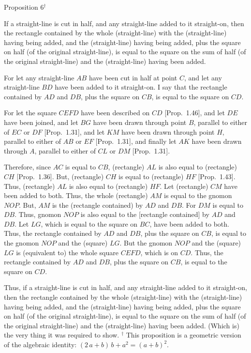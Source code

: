 
\begin{center}
{\large Proposition 6$^\dag$}
\end{center}

If a straight-line is cut in half, and any straight-line added to it straight-on,
then the rectangle contained by the whole (straight-line) with the (straight-line) having being added, and the (straight-line) having being added,   plus the square on  half (of the original straight-line), is equal to the square on the
sum of  half  (of the original straight-line) and the (straight-line) having been added.

\epsfysize=1.8in
\centerline{}

For let any straight-line $AB$ have been cut in half at point $C$, and let any
straight-line $BD$ have been added to it straight-on. I say that the rectangle
contained by $AD$ and $DB$, plus the square on $CB$, is equal to the square on
$CD$.

For let the square $CEFD$ have been described on $CD$ [Prop.~1.46], and let $DE$ have been
joined, and let $BG$ have been drawn through point $B$, parallel to either of $EC$
or $DF$ [Prop.~1.31], and let $KM$ have been drawn through point $H$, parallel
to either of $AB$ or $EF$ [Prop.~1.31], and finally let $AK$ have been drawn
through $A$, parallel to either of $CL$ or $DM$ [Prop.~1.31].

Therefore, since $AC$ is equal to $CB$, (rectangle) $AL$ is also equal to (rectangle) $CH$ [Prop.~1.36]. But, (rectangle) $CH$ is equal to (rectangle) $HF$ [Prop.~1.43]. Thus, (rectangle) $AL$ is also equal to (rectangle) $HF$. Let (rectangle) $CM$ have
been added to both. Thus, the whole (rectangle) $AM$ is equal to the gnomon $NOP$.
But, $AM$ is  the (rectangle contained) by $AD$ and $DB$. For
$DM$ is equal to $DB$. Thus, gnomon $NOP$ is also equal to the
[rectangle contained] by $AD$ and $DB$.
Let $LG$, which is equal to the square on $BC$, have been added to both.
Thus, the rectangle contained by $AD$ and $DB$, plus the square on $CB$, is equal
to the gnomon $NOP$ and the (square) $LG$. But the gnomon $NOP$ and 
the (square) $LG$ is (equivalent to) the whole square $CEFD$, which is on  $CD$. Thus, the rectangle
contained by $AD$ and $DB$, plus the square on $CB$, is equal to the square on $CD$.

Thus, if a straight-line is cut in half, and any straight-line added to it straight-on,
then the rectangle contained by the whole (straight-line) with the (straight-line) having being added, and the (straight-line) having being added,   plus the square on  half (of the original straight-line), is equal to the square on the
sum of  half  (of the original straight-line) and the (straight-line) having been added. (Which is) the very thing it was required to show.
{\footnotesize \noindent$^\dag$ This proposition is a geometric version
of the algebraic identity: $(2\,a+b)\,b + a^2 = (a+b)^2$.}

